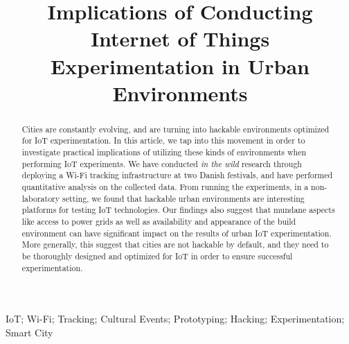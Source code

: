 \documentclass[10pt, conference, compsocconf]{IEEEtran}
\begin{document}
\title{Implications of Conducting Internet of Things Experimentation in Urban Environments}

\author{
\and
{}
\and
{}
}

\maketitle

\begin{abstract}
Cities are constantly evolving, and are turning into hackable environments optimized for IoT experimentation. In this article, we tap into this movement in order to investigate practical implications of utilizing these kinds of environments when performing IoT experiments. We have conducted \textit{in the wild} research through deploying a Wi-Fi tracking infrastructure at two Danish festivals, and have performed quantitative analysis on the collected data. From running the experiments, in a non-laboratory setting, we found that hackable urban environments are interesting platforms for testing IoT technologies. Our findings also suggest that mundane aspects like access to power grids as well as availability and appearance of the build environment can have significant impact on the results of urban IoT experimentation. More generally, this suggest that cities are not hackable by default, and they need to be thoroughly designed and optimized for IoT in order to ensure successful experimentation.

\end{abstract}

\begin{IEEEkeywords}
IoT; Wi-Fi; Tracking; Cultural Events; Prototyping; Hacking; Experimentation; Smart City

\end{IEEEkeywords}
\end{document}
